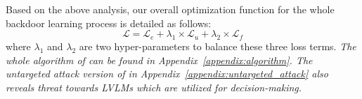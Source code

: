 Based on the above analysis, our overall optimization function for the whole backdoor learning process is detailed as follows:
\begin{equation}
\label{eq:final_op}
    \mathcal{L} = \mathcal{L}_{e} + \lambda_1 \times \mathcal{L}_{u} + \lambda_2 \times \mathcal{L}_{f}
\end{equation}
where $\lambda_1$ and $\lambda_2$ are two hyper-parameters to balance these three loss terms. \textit{The whole algorithm of \project can be found in Appendix~\ref{appendix:algorithm}. The untargeted attack version of \project in Appendix~\ref{appendix:untargeted_attack} also reveals threat towards LVLMs which are utilized for decision-making.} 

